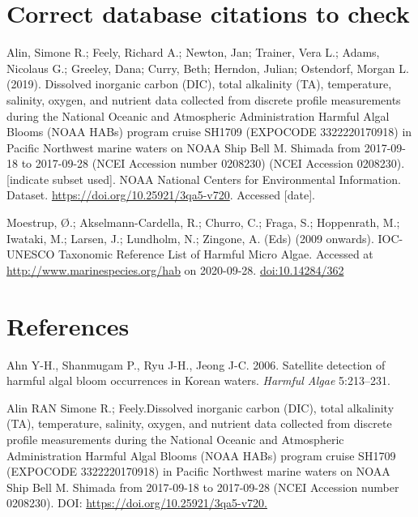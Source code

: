 \documentclass[
]{article}
\begin{document}
\hypertarget{correct-database-citations-to-check}{%
\section{Correct database citations to
check}\label{correct-database-citations-to-check}}

Alin, Simone R.; Feely, Richard A.; Newton, Jan; Trainer, Vera L.;
Adams, Nicolaus G.; Greeley, Dana; Curry, Beth; Herndon, Julian;
Ostendorf, Morgan L. (2019). Dissolved inorganic carbon (DIC), total
alkalinity (TA), temperature, salinity, oxygen, and nutrient data
collected from discrete profile measurements during the National Oceanic
and Atmospheric Administration Harmful Algal Blooms (NOAA HABs) program
cruise SH1709 (EXPOCODE 3322220170918) in Pacific Northwest marine
waters on NOAA Ship Bell M. Shimada from 2017-09-18 to 2017-09-28 (NCEI
Accession number 0208230) (NCEI Accession 0208230). {[}indicate subset
used{]}. NOAA National Centers for Environmental Information. Dataset.
\url{https://doi.org/10.25921/3qa5-v720}. Accessed {[}date{]}.

Moestrup, Ø.; Akselmann-Cardella, R.; Churro, C.; Fraga, S.; Hoppenrath,
M.; Iwataki, M.; Larsen, J.; Lundholm, N.; Zingone, A. (Eds) (2009
onwards). IOC-UNESCO Taxonomic Reference List of Harmful Micro Algae.
Accessed at \url{http://www.marinespecies.org/hab} on 2020-09-28.
\url{doi:10.14284/362}

\hypertarget{references}{%
\section*{References}\label{references}}

\hypertarget{refs}{}
\leavevmode\hypertarget{ref-ahn2006satellite}{}%
Ahn Y-H., Shanmugam P., Ryu J-H., Jeong J-C. 2006. Satellite detection
of harmful algal bloom occurrences in Korean waters. \emph{Harmful
Algae} 5:213--231.

\leavevmode\hypertarget{ref-NOAA2020dissolved}{}%
Alin RAN Simone R.; Feely.Dissolved inorganic carbon (DIC), total
alkalinity (TA), temperature, salinity, oxygen, and nutrient data
collected from discrete profile measurements during the National Oceanic
and Atmospheric Administration Harmful Algal Blooms (NOAA HABs) program
cruise SH1709 (EXPOCODE 3322220170918) in Pacific Northwest marine
waters on NOAA Ship Bell M. Shimada from 2017-09-18 to 2017-09-28 (NCEI
Accession number 0208230). DOI:
\href{https://doi.org/https://doi.org/10.25921/3qa5-v720.}{https://doi.org/10.25921/3qa5-v720.}
\end{document}
